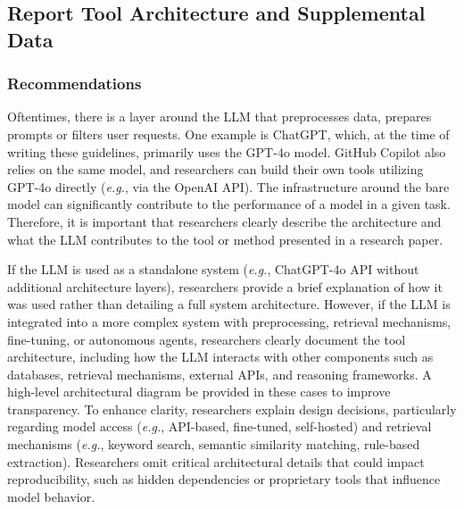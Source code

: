 



\subsection{Report Tool Architecture and Supplemental Data}

\subsubsection{Recommendations}

Oftentimes, there is a layer around the LLM that preprocesses data, prepares prompts or filters user requests. One example is ChatGPT, which, at the time of writing these guidelines, primarily uses the GPT-4o model. GitHub Copilot also relies on the same model, and researchers can build their own tools utilizing GPT-4o directly (\textit{e.g.}, via the OpenAI API). The infrastructure around the bare model can significantly contribute to the performance of a model in a given task.
Therefore, it is important that researchers clearly describe the architecture and what the LLM contributes to the tool or method presented in a research paper.


If the LLM is used as a standalone system (\textit{e.g.}, ChatGPT-4o API without additional architecture layers), researchers \should provide a brief explanation of how it was used rather than detailing a full system architecture. However, if the LLM is integrated into a more complex system with preprocessing, retrieval mechanisms, fine-tuning, or autonomous agents, researchers \must clearly document the tool architecture, including how the LLM interacts with other components such as databases, retrieval mechanisms, external APIs, and reasoning frameworks. A high-level architectural diagram \should be provided in these cases to improve transparency. To enhance clarity, researchers \should explain design decisions, particularly regarding model access (\textit{e.g.}, API-based, fine-tuned, self-hosted) and retrieval mechanisms (\textit{e.g.}, keyword search, semantic similarity matching, rule-based extraction). Researchers \mustnot omit critical architectural details that could impact reproducibility, such as hidden dependencies or proprietary tools that influence model behavior. 

